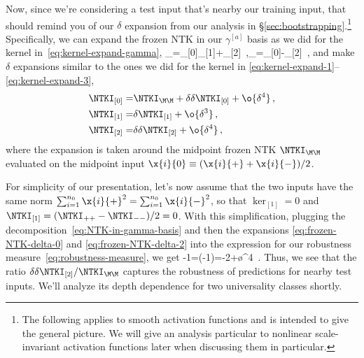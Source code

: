 Now, since we're considering a test input that's nearby our training input, that should remind you of our $\delta$ expansion from our  analysis in \S\ref{sec:bootstrapping}.\footnote{
    The following applies to smooth activation functions and is intended to give the general picture. We will give an analysis particular to nonlinear scale-invariant activation functions later when discussing them in particular.
}
Specifically, we can expand the frozen NTK in our $\gamma^{[a]}$ basis as we did for the kernel in~\eqref{eq:kernel-expand-gamma},
\be\label{eq:NTK-in-gamma-basis}
\NTKI_{\pm\pm}=\NTKI_{[0]}\pm\NTKI_{[1]}+\NTKI_{[2]}\, ,\qquad \NTKI_{\pm\mp}=\NTKI_{[0]}-\NTKI_{[2]}\, ,
\ee
and make $\delta$ expansions similar to the ones we did for the kernel in \eqref{eq:kernel-expand-1}--\eqref{eq:kernel-expand-3},
\begin{align}\label{eq:frozen-NTK-delta-0}
\NTKI_{[0]}=&\NTKI_{\M\M}+\delta\delta\NTKI_{[0]}+\o{\delta^4}\, ,\\
\NTKI_{[1]}=&\delta\NTKI_{[1]}+\o{\delta^3}\, ,\label{eq:frozen-NTK-delta-1}\\
\NTKI_{[2]}=&\delta\delta\NTKI_{[2]}+\o{\delta^4}\, ,
\label{eq:frozen-NTK-delta-2}
\end{align}
where the expansion is taken around the midpoint frozen NTK $\NTKI_{\M\M}$ evaluated on the midpoint input $\x{i}{0}\equiv (\x{i}{+}+\x{i}{-})/2$.

For simplicity of our presentation, let's now assume that the two inputs have the same norm $\sum_{i=1}^{n_0} \x{i}{+}^2=\sum_{i=1}^{n_0} \x{i}{-}^2$, so that $\ker_{[1]}=0$ and $\NTKI_{[1]}=(\NTKI_{++}-\NTKI_{--})/2=0$.
With this simplification, plugging the decomposition~\eqref{eq:NTK-in-gamma-basis} and then the expansions \eqref{eq:frozen-NTK-delta-0} and \eqref{eq:frozen-NTK-delta-2} into the expression for our robustness measure~\eqref{eq:robustness-measure}, we get
\be\label{eq:robustness-measure-plugged-in}
\frac{\NTKI_{-+}}{\NTKI_{++}}-1=\le(\frac{\NTKI_{[0]}-\NTKI_{[2]}}{\NTKI_{[0]}+\NTKI_{[2]}}-1\ri)=-2\frac{\delta\delta\NTKI_{[2]}}{\NTKI_{\M\M}}+\o{\delta^4}\, .
\ee
Thus, we see that the ratio $\delta\delta\NTKI_{[2]}/\NTKI_{\M\M}$ captures the robustness of predictions for nearby test inputs. We'll analyze its depth dependence for two universality classes shortly.




